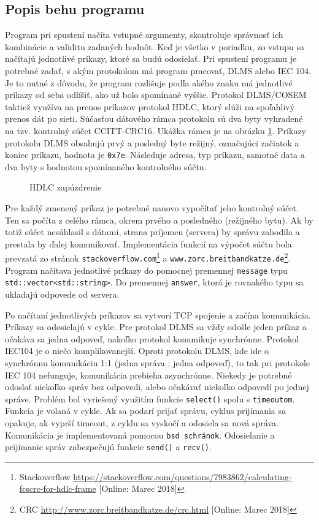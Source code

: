 \subsection{Popis behu programu}
\tab Program pri spustení načíta vstupné argumenty, skontroluje správnosť ich kombinácie a validitu zadaných hodnôt. Keď je všetko v poriadku, zo vstupu sa načítajú jednotlivé príkazy, ktoré sa budú odosielať. Pri spustení programu je potrebné zadať, s akým protokolom má program pracovať, DLMS alebo IEC 104. Je to nutné z dôvodu, že program rozlišuje podľa akého znaku má jednotlivé príkazy od seba odlíšiť, ako už bolo spomínané vyššie. Protokol DLMS/COSEM taktiež využíva na prenos príkazov protokol HDLC, ktorý slúži na spoľahlivý prenos dát po sieti. Súčasťou dátového rámca protokolu sú dva byty vyhradené na tzv. kontrolný súčet CCITT-CRC16. Ukážka rámca je na obrázku \ref{hdlc}. Príkazy protokolu DLMS obsahujú prvý a posledný byte režijný, označujúci začiatok a koniec príkazu, hodnota je {\tt 0x7e}. Následuje adresa, typ príkazu, samotné data a dva byty s hodnotou spomínaného kontrolného súčtu. 
\begin{figure}[h]
    \centering
    \caption{HDLC zapúzdrenie}
\label{hdlc}
\end{figure}
Pre každý zmenený príkaz je potrebné nanovo vypočítať jeho kontrolný súčet. Ten sa počíta z celého rámca, okrem prvého a posledného (režijného bytu). Ak by totiž súčet nesúhlasil s dátami, strana príjemcu (servera) by správu zahodila a prestala by ďalej komunikovať. Implementácia funkcií na výpočet súčtu bola prevzatá zo stránok {\tt stackoverflow.com}\footnote{Stackoverflow \url{https://stackoverflow.com/questions/7983862/calculating-fcscrc-for-hdlc-frame} [Online: Marec 2018]} a {\tt www.zorc.breitbandkatze.de}\footnote{CRC \url{http://www.zorc.breitbandkatze.de/crc.html} [Online: Marec 2018]}. Program načítava jednotlivé príkazy do pomocnej premennej {\tt message} typu {\tt std::vector<std::string>}. Do premennej {\tt answer}, ktorá je rovnakého typu sa ukladajú odpovede od servera. \par
Po načítaní jednotlivých príkazov sa vytvorí TCP spojenie a začína komunikácia. Príkazy sa odosielajú v cykle. Pre protokol DLMS sa vždy odošle jeden príkaz a očakáva sa jedna odpoveď, nakoľko protokol komunikuje synchrónne. Protokol IEC104 je o niečo komplikovanejší. Oproti protokolu DLMS, kde ide o synchrónnu komunikáciu 1:1 (jedna správa : jedna odpoveď), to tak pri protokole IEC 104 nefunguje, komunikácia prebieha asynchrónne. Niekedy je potrebné odoslať niekoľko správ bez odpovedi, alebo očakávať niekoľko odpovedí po jednej správe. Problém bol vyriešený využitím funkcie {\tt select()} spolu s {\tt timeoutom}. Funkcia je volaná v cykle. Ak sa podarí prijať správu, cyklus prijímania sa opakuje, ak vyprší timeout, z cyklu sa vyskočí a odosiela sa nová správa.
Komunikácia je implementovaná pomocou {\tt bsd schránok}. Odosielanie a prijímanie správ zabezpečujú funkcie {\tt send()} a {\tt recv()}. 
